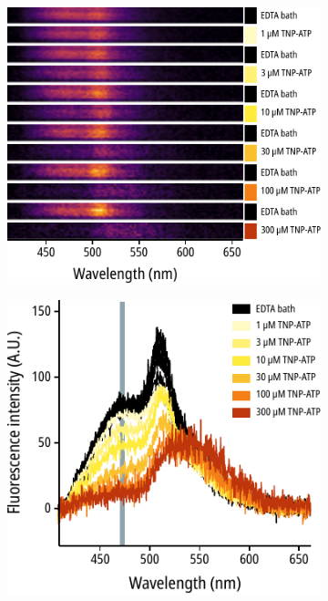 \begin{figure}[h]
\begin{subfigure}[t]{0.3\textwidth}
	\end{subfigure}
	\hfill
	\begin{subfigure}[t]{0.6\textwidth}
		\caption{}\label{ch3fig:unroofed_spectral_images}
		\centering
		\includegraphics[width=\textwidth]{unroofed_spectral_images.pdf}
	\end{subfigure}
	\vfill
	\begin{subfigure}[t]{0.45\textwidth}
		\caption{}\label{ch3fig:unroofed_spectral_traces}
		\centering
		\includegraphics[width=\textwidth]{unroofed_spectral_traces.pdf}

\end{subfigure}
\end{figure}
